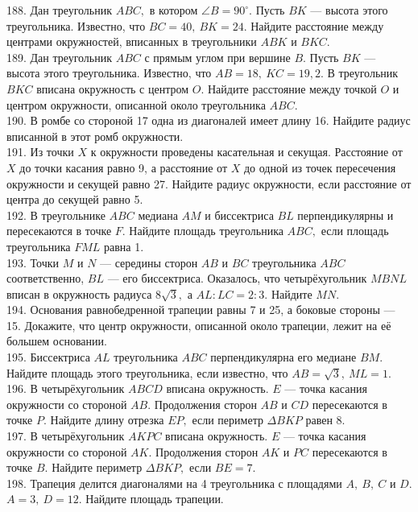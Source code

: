 \documentclass[12pt]{article}
\begin{document}
188. Дан треугольник $ABC,$ в котором $\angle B=90^\circ.$ Пусть $BK$ --- высота этого треугольника. Известно, что $BC=40,\ BK=24.$ Найдите расстояние между центрами окружностей, вписанных в треугольники $ABK$ и $BKC.$\\
189. Дан треугольник $ABC$ с прямым углом при вершине $B.$ Пусть $BK$ --- высота этого треугольника. Известно, что $AB=18,\ KC=19,2.$ В треугольник $BKC$ вписана окружность с центром $O.$ Найдите расстояние между точкой $O$ и центром окружности, описанной около треугольника $ABC.$\\
190. В ромбе со стороной 17 одна из диагоналей имеет длину 16. Найдите радиус вписанной в этот ромб окружности.\\
191. Из точки $X$ к окружности проведены касательная и секущая. Расстояние от $X$ до точки касания равно 9, а расстояние от $X$ до одной из точек пересечения окружности и секущей равно 27. Найдите радиус окружности, если расстояние от центра до секущей равно 5.\\
192. В треугольнике $ABC$ медиана $AM$ и биссектриса $BL$ перпендикулярны и пересекаются в точке $F.$ Найдите площадь треугольника $ABC,$ если площадь треугольника $FML$ равна 1.\\
193. Точки $M$ и $N$ --- середины сторон $AB$ и $BC$ треугольника $ABC$ соответственно, $BL$ --- его биссектриса. Оказалось, что четырёхугольник $MBNL$ вписан в окружность радиуса $8\sqrt{3},$ а $AL:LC=2:3.$ Найдите $MN.$\\
194. Основания равнобедренной трапеции равны 7 и 25, а боковые стороны --- 15. Докажите, что центр окружности, описанной около трапеции, лежит на её большем основании.\\
195. Биссектриса $AL$ треугольника $ABC$ перпендикулярна его медиане $BM.$ Найдите площадь этого треугольника, если известно, что $AB=\sqrt{3},\ ML=1.$\\
196. В четырёхугольник $ABCD$ вписана окружность. $E$ --- точка касания окружности со стороной $AB.$ Продолжения сторон $AB$ и $CD$ пересекаются в точке $P.$ Найдите длину отрезка $EP,$ если периметр $\Delta BKP$ равен 8.\\
197. В четырёхугольник $AKPC$ вписана окружность. $E$ --- точка касания окружности со стороной $AK.$ Продолжения сторон $AK$ и $PC$ пересекаются в точке $B.$ Найдите периметр $\Delta BKP,$ если $BE=7.$\\
198. Трапеция делится диагоналями на 4 треугольника с площадями $A,\ B,\ C$ и $D.$ $A=3,\ D=12.$ Найдите площадь трапеции.\\
\end{document}
